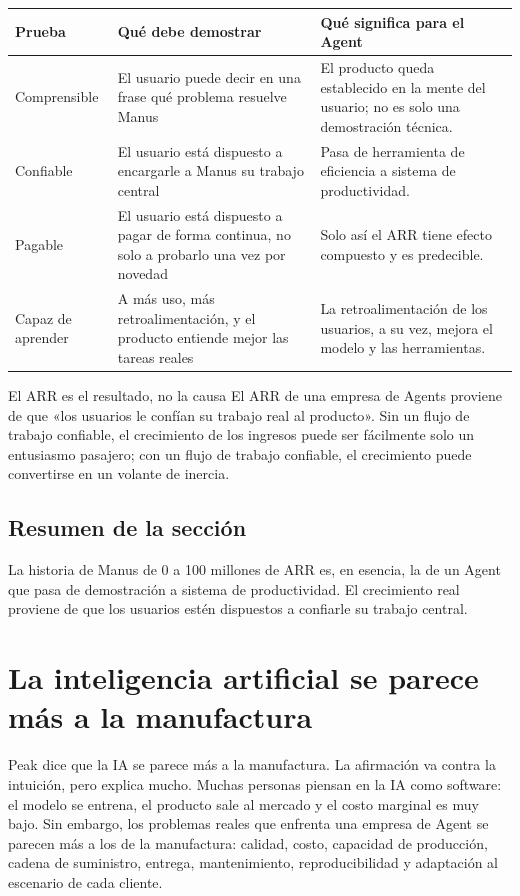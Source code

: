 \documentclass[a4paper]{article}
\begin{document}
\begin{longtable}{p{}p{}p{}}
\toprule
Prueba & Qué debe demostrar & Qué significa para el Agent \\
\midrule
Comprensible & El usuario puede decir en una frase qué problema resuelve Manus & El producto queda establecido en la mente del usuario; no es solo una demostración técnica. \\
Confiable & El usuario está dispuesto a encargarle a Manus su trabajo central & Pasa de herramienta de eficiencia a sistema de productividad. \\
Pagable & El usuario está dispuesto a pagar de forma continua, no solo a probarlo una vez por novedad & Solo así el ARR tiene efecto compuesto y es predecible. \\
Capaz de aprender & A más uso, más retroalimentación, y el producto entiende mejor las tareas reales & La retroalimentación de los usuarios, a su vez, mejora el modelo y las herramientas. \\
\bottomrule
\end{longtable}

\begin{importantbox}{El ARR es el resultado, no la causa}
El ARR de una empresa de Agents proviene de que «los usuarios le confían su trabajo real al producto». Sin un flujo de trabajo confiable, el crecimiento de los ingresos puede ser fácilmente solo un entusiasmo pasajero; con un flujo de trabajo confiable, el crecimiento puede convertirse en un volante de inercia.
\end{importantbox}

\subsection{Resumen de la sección}

La historia de Manus de 0 a 100 millones de ARR es, en esencia, la de un Agent que pasa de demostración a sistema de productividad. El crecimiento real proviene de que los usuarios estén dispuestos a confiarle su trabajo central.
\section{La inteligencia artificial se parece más a la manufactura}

Peak dice que la IA se parece más a la manufactura. La afirmación va contra la intuición, pero explica mucho. Muchas personas piensan en la IA como software: el modelo se entrena, el producto sale al mercado y el costo marginal es muy bajo. Sin embargo, los problemas reales que enfrenta una empresa de Agent se parecen más a los de la manufactura: calidad, costo, capacidad de producción, cadena de suministro, entrega, mantenimiento, reproducibilidad y adaptación al escenario de cada cliente.
\end{document}
